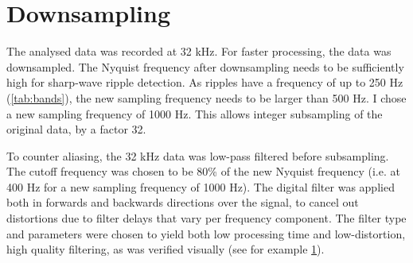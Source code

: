 
\section{Downsampling}

The analysed data was recorded at 32 kHz. For faster processing, the data was downsampled. The Nyquist frequency after downsampling needs to be sufficiently high for sharp-wave ripple detection.\footnotemark{} As ripples have a frequency of up to 250 Hz (\cref{tab:bands}), the new sampling frequency needs to be larger than 500 Hz. I chose a new sampling frequency of 1000 Hz. This allows integer subsampling of the original data, by a factor 32.


To counter aliasing, the 32 kHz data was low-pass filtered before subsampling.\footnotemark{} The cutoff frequency was chosen to be 80\% of the new Nyquist frequency (i.e. at 400 Hz for a new sampling frequency of 1000 Hz). The digital filter was applied both in forwards and backwards directions over the signal, to cancel out distortions due to filter delays that vary per frequency component. The filter type and parameters were chosen to yield both low processing time and low-distortion, high quality filtering, as was verified visually (see for example \cref{fig:downsample}).


\begin{figure}
\label{fig:downsample}
\end{figure}
